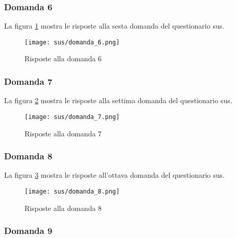 \subsubsection*{Domanda 6}

\vspace{5pt}
\begin{minipage}{\textwidth}
  \noindent La figura \ref{fig:sus_q6} mostra le risposte alla sesta domanda del questionario \gls{sus}.
  \begin{figure}[H]
    \centering
    \texttt{[image: sus/domanda\_6.png]}
    \caption{Risposte alla domanda 6}
    \label{fig:sus_q6}
  \end{figure}
\end{minipage}

\subsubsection*{Domanda 7}

\vspace{5pt}
\begin{minipage}{\textwidth}
  \noindent La figura \ref{fig:sus_q7} mostra le risposte alla settima domanda del questionario \gls{sus}.
  \begin{figure}[H]
    \centering
    \texttt{[image: sus/domanda\_7.png]}
    \caption{Risposte alla domanda 7}
    \label{fig:sus_q7}
  \end{figure}
\end{minipage}

\subsubsection*{Domanda 8}

\vspace{5pt}
\begin{minipage}{\textwidth}
  \noindent La figura \ref{fig:sus_q8} mostra le risposte all'ottava domanda del questionario \gls{sus}.
  \begin{figure}[H]
    \centering
    \texttt{[image: sus/domanda\_8.png]}
    \caption{Risposte alla domanda 8}
    \label{fig:sus_q8}
  \end{figure}
\end{minipage}

\subsubsection*{Domanda 9}


